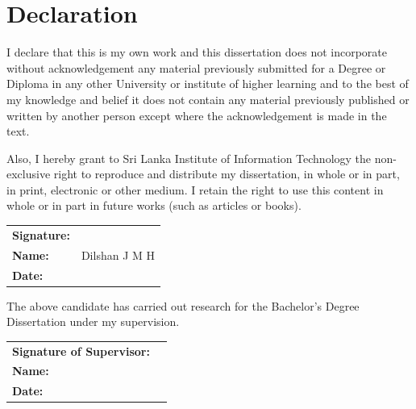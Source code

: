 \chapter*{Declaration}
\thispagestyle{plain}

\begin{singlespace}

I declare that this is my own work and this dissertation does not incorporate
without acknowledgement any material previously submitted for a Degree or
Diploma in any other University or institute of higher learning and to the best of
my knowledge and belief it does not contain any material previously published or
written by another person except where the acknowledgement is made in the text.

\bigskip

Also, I hereby grant to Sri Lanka Institute of Information Technology the
non-exclusive right to reproduce and distribute my dissertation, in whole or in
part, in print, electronic or other medium. I retain the right to use this content in
whole or in part in future works (such as articles or books).

\bigskip\bigskip

\noindent
\begin{tabular}{@{}ll}
  \textbf{Signature:} & \underline{\hspace{6cm}} \\[10pt]
  \textbf{Name:}      & Dilshan J M H \\[10pt]    
  \textbf{Date:}      & \underline{\hspace{6cm}} \\
\end{tabular}

\vspace{1.5cm}

The above candidate has carried out research for the Bachelor's Degree
Dissertation under my supervision.

\bigskip\bigskip

\noindent
\begin{tabular}{@{}ll}
  \textbf{Signature of Supervisor:} & \underline{\hspace{5cm}} \\[10pt]
  \textbf{Name:}                    & \underline{\hspace{5cm}} \\[10pt]  
  \textbf{Date:}                    & \underline{\hspace{5cm}} \\
\end{tabular}

\end{singlespace}
\clearpage

